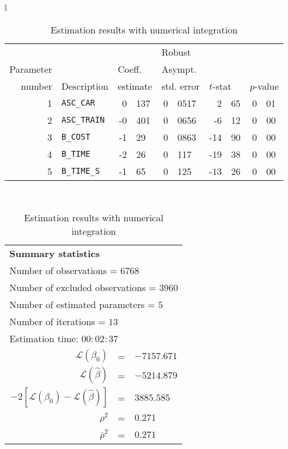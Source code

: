 \documentclass[12pt,a4paper]{article}
\begin{document}
\begin{table}[htb]
  \begin{tabular}{l}
\begin{tabular}{rlr@{.}lr@{.}lr@{.}lr@{.}l}
         &                       &   \multicolumn{2}{l}{}    & \multicolumn{2}{l}{Robust}  &     \multicolumn{4}{l}{}   \\
Parameter &                       &   \multicolumn{2}{l}{Coeff.}      & \multicolumn{2}{l}{Asympt.}  &     \multicolumn{4}{l}{}   \\
number &  Description                     &   \multicolumn{2}{l}{estimate}      & \multicolumn{2}{l}{std. error}  &   \multicolumn{2}{l}{$t$-stat}  &   \multicolumn{2}{l}{$p$-value}   \\

\hline

1 & \lstinline$ASC_CAR$ & 0&137 & 0&0517 & 2&65 & 0&01\\
2 & \lstinline$ASC_TRAIN$ & -0&401 & 0&0656 & -6&12 & 0&00\\
3 & \lstinline$B_COST$ & -1&29 & 0&0863 & -14&90 & 0&00\\
4 & \lstinline$B_TIME$ & -2&26 & 0&117 & -19&38 & 0&00\\
5 & \lstinline$B_TIME_S$ & -1&65 & 0&125 & -13&26 & 0&00\\
\hline
\end{tabular}
\\
\begin{tabular}{rcl}
\multicolumn{3}{l}{\bf Summary statistics}\\
\multicolumn{3}{l}{ Number of observations = $6768$} \\
\multicolumn{3}{l}{ Number of excluded observations = $3960$} \\
\multicolumn{3}{l}{ Number of estimated  parameters = $5$} \\
\multicolumn{3}{l}{ Number of iterations = $13$} \\
\multicolumn{3}{l}{ Estimation time: $00:02:37$} \\
 $\mathcal{L}(\beta_0)$ &=&  $-7157.671$ \\
 $\mathcal{L}(\hat{\beta})$ &=& $-5214.879 $  \\
 $-2[\mathcal{L}(\beta_0) -\mathcal{L}(\hat{\beta})]$ &=& $3885.585$ \\
    $\rho^2$ &=&   $0.271$ \\
    $\bar{\rho}^2$ &=&    $0.271$ \\
\end{tabular}
  \end{tabular}

\caption{\label{tab:estNumerical}Estimation results with numerical integration}
\end{table}
\end{document}
